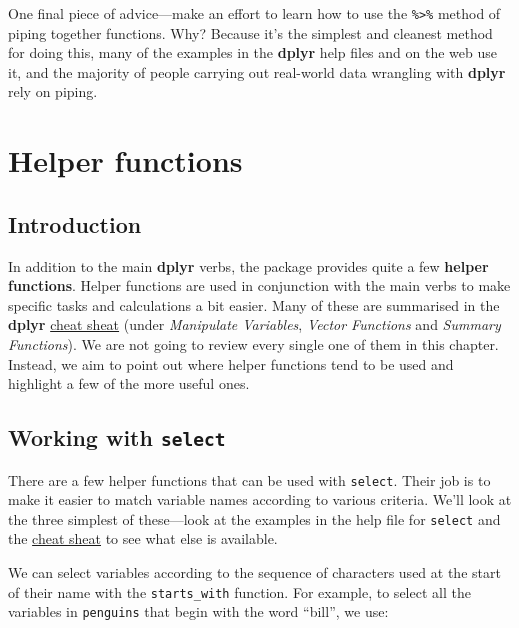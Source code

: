 \documentclass[
]{book}
\begin{document}
One final piece of advice---make an effort to learn how to use the \texttt{\%\textgreater{}\%} method of piping together functions. Why? Because it's the simplest and cleanest method for doing this, many of the examples in the \textbf{dplyr} help files and on the web use it, and the majority of people carrying out real-world data wrangling with \textbf{dplyr} rely on piping.

\hypertarget{helper-functions}{%
\chapter{Helper functions}\label{helper-functions}}

\hypertarget{introduction-5}{%
\section{Introduction}\label{introduction-5}}

In addition to the main \textbf{dplyr} verbs, the package provides quite a few \textbf{helper functions}. Helper functions are used in conjunction with the main verbs to make specific tasks and calculations a bit easier. Many of these are summarised in the \textbf{dplyr} \href{https://github.com/rstudio/cheatsheets/raw/master/data-transformation.pdf}{cheat sheat} (under \emph{Manipulate Variables}, \emph{Vector Functions} and \emph{Summary Functions}). We are not going to review every single one of them in this chapter. Instead, we aim to point out where helper functions tend to be used and highlight a few of the more useful ones.

\hypertarget{working-with-select}{%
\section{\texorpdfstring{Working with \texttt{select}}{Working with select}}\label{working-with-select}}

There are a few helper functions that can be used with \texttt{select}. Their job is to make it easier to match variable names according to various criteria. We'll look at the three simplest of these---look at the examples in the help file for \texttt{select} and the \href{https://github.com/rstudio/cheatsheets/raw/master/data-transformation.pdf}{cheat sheat} to see what else is available.

We can select variables according to the sequence of characters used at the start of their name with the \texttt{starts\_with} function. For example, to select all the variables in \texttt{penguins} that begin with the word ``bill'', we use:
\end{document}
